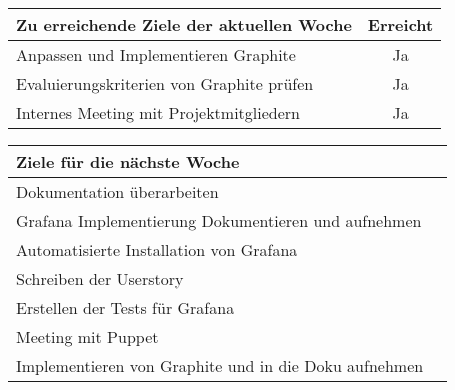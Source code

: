 \begin{tabularx}{\textwidth}{Xc}
    \arrayrulecolor{OliveGreen}
    \toprule
    {\bfseries Zu erreichende Ziele der aktuellen Woche} & {\bfseries Erreicht} \\
    \midrule[2pt]
    Anpassen und Implementieren Graphite                    &Ja              \\
    \rowcolor{OliveGreen!15}
    Evaluierungskriterien von Graphite prüfen               &Ja              \\
    \rowcolor{White}
    Internes Meeting mit Projektmitgliedern                 &Ja              \\
    \bottomrule[2pt]
\end{tabularx}
%
\vspace{1cm}
%
\begin{tabularx}{\textwidth}{Xc}
    \arrayrulecolor{OliveGreen}
    \toprule
    {\bfseries Ziele für die nächste Woche}        &                         \\
    \midrule[2pt]
    Dokumentation überarbeiten                     &                         \\
    \rowcolor{OliveGreen!15}
    Grafana Implementierung Dokumentieren und aufnehmen   &                  \\
    \rowcolor{White}
    Automatisierte Installation von Grafana        &                         \\
    \rowcolor{OliveGreen!15}
    Schreiben der Userstory                        &                         \\
    \rowcolor{White}
    Erstellen der Tests für Grafana                &                         \\
    \rowcolor{OliveGreen!15}
    Meeting mit Puppet                             &                         \\
    \rowcolor{White}
    Implementieren von Graphite und in die Doku aufnehmen &                  \\
\end{tabularx}

